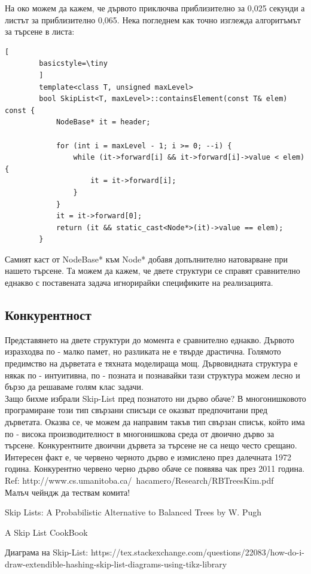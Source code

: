 \documentclass[a4paper,12pt,fleqn]{article}
\begin{document}
	На око можем да кажем, че дървото приключва приблизително за 0,025 секунди а листът за приблизително 0,065. Нека погледнем как точно изглежда алгоритъмът за търсене в листа:\\
	\begin{lstlisting}[
		basicstyle=\tiny
		]
		template<class T, unsigned maxLevel>
		bool SkipList<T, maxLevel>::containsElement(const T& elem) const {
			NodeBase* it = header;
			
			for (int i = maxLevel - 1; i >= 0; --i) {
				while (it->forward[i] && it->forward[i]->value < elem) {
					it = it->forward[i];
				}
			}
			it = it->forward[0];
			return (it && static_cast<Node*>(it)->value == elem);
		}
	\end{lstlisting}
Самият каст от NodeBase* към Node* добавя допълнително натоварване при нашето търсене. Та можем да кажем, че двете структури се справят сравнително еднакво с поставената задача игнорирайки спецификите на реализацията.

\subsection{Конкурентност}
Представянето на двете структури до момента е сравнително еднакво. Дървото изразходва по - малко памет, но разликата не е твърде драстична. Голямото предимство на дърветата е тяхната моделираща мощ. Дървовидната структура е някак по - интуитивна, по - позната и познавайки тази структура можем лесно и бързо да решаваме голям клас задачи.\\
Защо бихме избрали Skip-List пред познатото ни дърво обаче? В многонишковото програмиране този тип свързани списъци се оказват предпочитани пред дърветата.
Оказва се, че можем да направим такъв тип свързан списък, който има по - висока производителност в многонишкова среда от двоично дърво за търсене. Конкурентните двоични дървета за търсене не са нещо често срещано. Интересен факт е, че червено черното дърво е измислено през далечната 1972 година. Конкурентно червено черно дърво обаче се появява чак през 2011 година.\\
Ref: http://www.cs.umanitoba.ca/~hacamero/Research/RBTreesKim.pdf\\

Малъч чейндж да тествам комита!

\begin{thebibliography}{9}
 Skip Lists: A Probabilistic Alternative to Balanced Trees by W. Pugh

 A Skip List CookBook

 Диаграма на Skip-List: https://tex.stackexchange.com/questions/22083/how-do-i-draw-extendible-hashing-skip-list-diagrams-using-tikz-library
\end{thebibliography}
\end{document}
